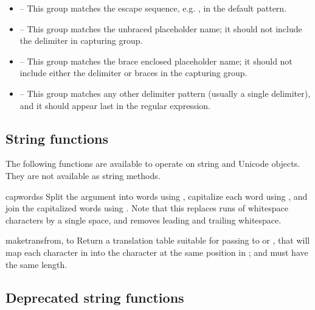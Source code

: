 \begin{itemize}
\item {} -- This group matches the escape sequence,
      e.g. \samp{\$\$}, in the default pattern.
\item {} -- This group matches the unbraced placeholder name; it
      should not include the delimiter in capturing group.
\item {} -- This group matches the brace enclosed placeholder name;
      it should not include either the delimiter or braces in the capturing
      group.
\item {} -- This group matches any other delimiter pattern (usually
      a single delimiter), and it should appear last in the regular
      expression.
\end{itemize}

\subsection{String functions}

The following functions are available to operate on string and Unicode
objects.  They are not available as string methods.

\begin{funcdesc}{capwords}{s}
  Split the argument into words using , capitalize
  each word using , and join the capitalized
  words using .  Note that this replaces runs of
  whitespace characters by a single space, and removes leading and
  trailing whitespace.
\end{funcdesc}

\begin{funcdesc}{maketrans}{from, to}
  Return a translation table suitable for passing to
   or , that will map
  each character in  into the character at the same position
  in ;  and  must have the same length.

\end{funcdesc}

\subsection{Deprecated string functions}

